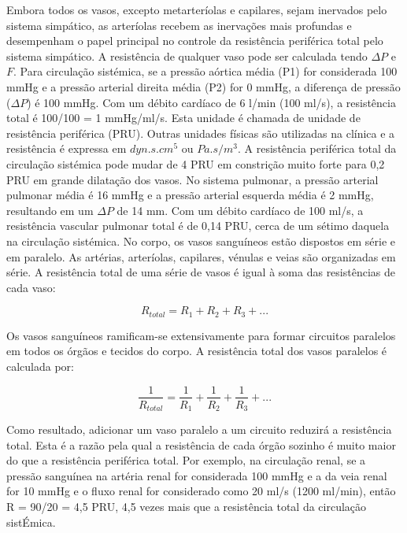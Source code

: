 \documentclass[
  portuguese,
  ]{book}
\begin{document}
Embora todos os vasos, excepto metarteríolas e capilares, sejam inervados pelo sistema simpático, as arteríolas recebem as inervações mais profundas e desempenham o papel principal no controle da resistência periférica total pelo sistema simpático.
A resistência de qualquer vaso pode ser calculada tendo \(\Delta P\) e \(F\). Para circulação sistémica, se a pressão aórtica média (P1) for considerada 100 mmHg e a pressão arterial direita média (P2) for 0 mmHg, a diferença de pressão (\(\Delta P\)) é 100 mmHg. Com um débito cardíaco de 6 l/min (100 ml/s), a resistência total é 100/100 = 1 mmHg/ml/s. Esta unidade é chamada de unidade de resistência periférica (PRU). Outras unidades físicas são utilizadas na clínica e a resistência é expressa em \(dyn.s.cm^5\) ou \(Pa.s/m^3\). A resistência periférica total da circulação sistémica pode mudar de 4 PRU em constrição muito forte para 0,2 PRU em grande dilatação dos vasos. No sistema pulmonar, a pressão arterial pulmonar média é 16 mmHg e a pressão arterial esquerda média é 2 mmHg, resultando em um \(\Delta P\) de 14 mm. Com um débito cardíaco de 100 ml/s, a resistência vascular pulmonar total é de 0,14 PRU, cerca de um sétimo daquela na circulação sistémica.
No corpo, os vasos sanguíneos estão dispostos em série e em paralelo. As artérias, arteríolas, capilares, vénulas e veias são organizadas em série. A resistência total de uma série de vasos é igual à soma das resistências de cada vaso:

\begin{equation}
R_{total}=R_1+R_2+R_3+...
\label{eq:resserie}
\end{equation}

Os vasos sanguíneos ramificam-se extensivamente para formar circuitos paralelos em todos os órgãos e tecidos do corpo. A resistência total dos vasos paralelos é calculada por:

\begin{equation}
\frac{1}{R_{total}}=\frac{1}{R_1}+\frac{1}{R_2}+\frac{1}{R_3}+...
\label{eq:respara}
\end{equation}

Como resultado, adicionar um vaso paralelo a um circuito reduzirá a resistência total. Esta é a razão pela qual a resistência de cada órgão sozinho é muito maior do que a resistência periférica total. Por exemplo, na circulação renal, se a pressão sanguínea na artéria renal for considerada 100 mmHg e a da veia renal for 10 mmHg e o fluxo renal for considerado como 20 ml/s (1200 ml/min), então R = 90/20 = 4,5 PRU, 4,5 vezes mais que a resistência total da circulação sistÉmica.
\end{document}
